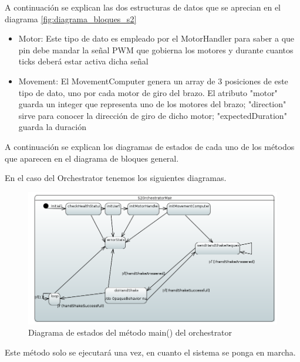 A continuación se explican las dos estructuras de datos que se aprecian en el diagrama \ref{fig:diagrama_bloques_s2}

\begin{itemize}
    \item Motor: Este tipo de dato es empleado por el MotorHandler para saber a que pin debe mandar la señal PWM que gobierna los motores y durante cuantos ticks deberá estar activa dicha señal
    
    \item Movement: El MovementComputer genera un array de 3 posiciones de este tipo de dato, uno por cada motor de giro del brazo. El atributo "motor" guarda un integer que representa uno de los motores del brazo; "direction" sirve para conocer la dirección de giro de dicho motor; "expectedDuration" guarda la duración  
\end{itemize}

A continuación se explican los diagramas de estados de cada uno de los métodos que aparecen en el diagrama de bloques general.

En el caso del Orchestrator tenemos los siguientes diagramas.

\begin{figure}[H]
    \centering
    \includegraphics[width=1\linewidth]{pictures/S2OrchestratorMain.PNG}
    \caption{Diagrama de estados del método main() del orchestrator}
    \label{fig:fun_main_orchestrator}
\end{figure}

Este método solo se ejecutará una vez, en cuanto el sistema se ponga en marcha. 

